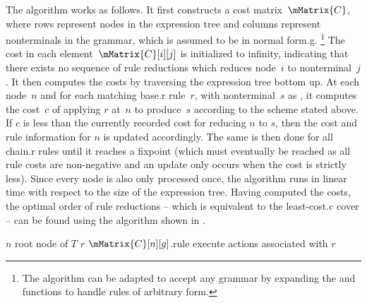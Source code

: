The algorithm works as follows.
%
It first constructs a cost matrix~$\mMatrix{C}$, where rows represent
\glspl{node} in the \gls{expression tree} and columns represent
\glspl{nonterminal} in the \gls{grammar}, which is assumed to be in \gls{normal
  form.g}.\!%
%
\footnote{%
  The algorithm can be adapted to accept any \gls{grammar} by expanding the
   and  functions to
  handle \glspl{rule} of arbitrary form.%
}
%
The cost in each element~\mbox{$\mMatrix{C}[i][j]$} is initialized to infinity,
indicating that there exists no sequence of \glspl{rule reduction} which reduces
\gls{node}~$i$ to \gls{nonterminal}~$j$.
%
It then computes the costs by traversing the \gls{expression tree} bottom up.
%
At each \gls{node}~$n$ and for each matching \gls{base.r} \gls{rule}~$r$, with
\gls{nonterminal}~$s$ as , it computes the cost~$c$ of
applying $r$ at~$n$ to produce~$s$ according to the scheme stated above.
%
If $c$ is less than the currently recorded cost for reducing $n$ to $s$, then
the cost and \gls{rule} information for $n$ is updated accordingly.
%
The same is then done for all \gls{chain.r} \glspl{rule} until it reaches a
fixpoint (which must eventually be reached as all \gls{rule} costs are
non-negative and an update only occurs when the cost is strictly less).
%
Since every \gls{node} is also only processed once, the algorithm runs in linear
time with respect to the size of the \gls{expression tree}.
%
Having computed the costs, the optimal order of \glspl{rule reduction} -- which
is equivalent to the \gls{least-cost.c} \gls{cover} -- can be found using the
algorithm shown in .

\begin{algorithm}[t]
  {%
    $n$ \Assign root node of $T$\;
    $r$ \Assign $\mMatrix{C}[n][g]$.rule\;
    execute actions associated with $r$\;
  }

  \caption[%
            Algorithm for selecting the rules chosen by
          ]%
          {%
            Selects optimal sequence of rules that reduces a given expression
            tree to a given nonterminal, based on costs computed
            by %
          }
\end{algorithm}

